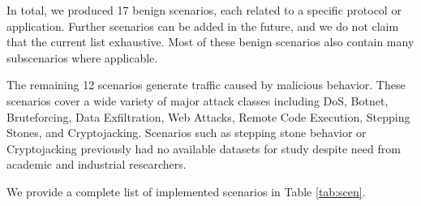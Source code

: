 \documentclass[sigconf]{acmart}
\begin{document}
In total, we produced 17 benign scenarios, each related to a specific protocol or application. Further scenarios can be added in the future, and we do not claim that the current list exhaustive. Most of these benign scenarios also contain many subscenarios where applicable.

The remaining 12 scenarios generate traffic caused by malicious behavior. These scenarios cover a wide variety of major attack classes including DoS, Botnet, Bruteforcing, Data Exfiltration, Web Attacks, Remote Code Execution, Stepping Stones, and Cryptojacking. 
Scenarios such as stepping stone behavior or Cryptojacking previously had no available datasets for study despite need from academic and industrial researchers.


We provide a complete list of implemented scenarios in Table \ref{tab:scen}.
\end{document}
